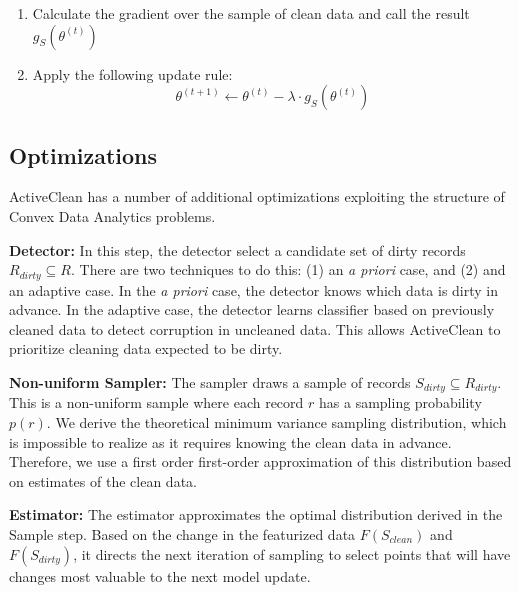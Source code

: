 \begin{enumerate}[noitemsep]
	\item Calculate the gradient over the sample of clean data and call the result $g_S(\theta^{(t)})$
	\item Apply the following update rule:
	\[
	\theta^{(t+1)} \leftarrow \theta^{(t)} - \lambda \cdot g_S(\theta^{(t)}) 
	\]
\end{enumerate} 

\subsection{Optimizations}
ActiveClean has a number of additional optimizations exploiting the structure of Convex Data Analytics problems.

\noindent\textbf{Detector: } In this step, the detector select a candidate set of dirty records $R_{dirty} \subseteq R$. There are two techniques to do this: (1) an \emph{a priori} case, and (2) and an adaptive case. In the \emph{a priori} case, the detector knows which data is dirty in advance. In the adaptive case, the detector learns classifier based on previously cleaned data to detect corruption in uncleaned data. This allows ActiveClean to prioritize cleaning data expected to be dirty. 

\vspace{0.5em}

\noindent\textbf{Non-uniform Sampler: } The sampler draws a sample of records $S_{dirty} \subseteq R_{dirty}$. This is a non-uniform sample where each record $r$ has a sampling probability $p(r)$.
We derive the theoretical minimum variance sampling distribution, which is impossible to realize as it requires knowing the clean data in advance. Therefore, we use a first order first-order approximation of this distribution based on estimates of the clean data. 

\vspace{0.5em}

\noindent\textbf{Estimator: } The estimator approximates the optimal distribution derived in the Sample step. Based on the change in the featurized data $F(S_{clean})$ and $F(S_{dirty})$, it directs the next iteration of sampling to select points that will have changes most valuable to the next model update.



